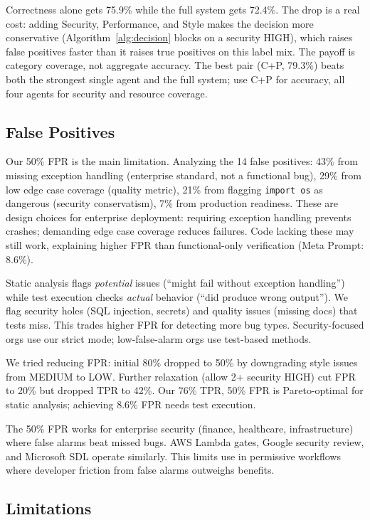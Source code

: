 \documentclass[10pt,twocolumn]{article}
\begin{document}
Correctness alone gets 75.9\% while the full system gets 72.4\%. The drop is a real cost: adding Security, Performance, and Style makes the decision more conservative (Algorithm~\ref{alg:decision} blocks on a security HIGH), which raises false positives faster than it raises true positives on this label mix. The payoff is category coverage, not aggregate accuracy. The best pair (C+P, 79.3\%) beats both the strongest single agent and the full system; use C+P for accuracy, all four agents for security and resource coverage.

\subsection{False Positives}

Our 50\% FPR is the main limitation. Analyzing the 14 false positives: 43\% from missing exception handling (enterprise standard, not a functional bug), 29\% from low edge case coverage (quality metric), 21\% from flagging \texttt{import os} as dangerous (security conservatism), 7\% from production readiness. These are design choices for enterprise deployment: requiring exception handling prevents crashes; demanding edge case coverage reduces failures. Code lacking these may still work, explaining higher FPR than functional-only verification (Meta Prompt: 8.6\%).

Static analysis flags \emph{potential} issues (``might fail without exception handling'') while test execution checks \emph{actual} behavior (``did produce wrong output''). We flag security holes (SQL injection, secrets) and quality issues (missing docs) that tests miss. This trades higher FPR for detecting more bug types. Security-focused orgs use our strict mode; low-false-alarm orgs use test-based methods.

We tried reducing FPR: initial 80\% dropped to 50\% by downgrading style issues from MEDIUM to LOW. Further relaxation (allow 2+ security HIGH) cut FPR to 20\% but dropped TPR to 42\%. Our 76\% TPR, 50\% FPR is Pareto-optimal for static analysis; achieving 8.6\% FPR needs test execution.

The 50\% FPR works for enterprise security (finance, healthcare, infrastructure) where false alarms beat missed bugs. AWS Lambda gates, Google security review, and Microsoft SDL operate similarly. This limits use in permissive workflows where developer friction from false alarms outweighs benefits.

\subsection{Limitations}
\end{document}
